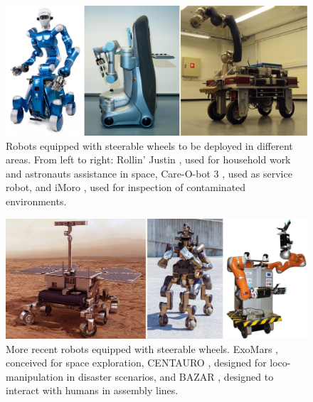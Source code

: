 \begin{figure}
    \centering
    \includegraphics[width=\textwidth]{figures/01-introduction/SWMRs-1.jpg}
    \caption{Robots equipped with steerable wheels to be deployed in different areas.
        From left to right: Rollin' Justin \cite{Fuchs2009RollinJustin}, used 
        for household work and astronauts assistance in space, 
        Care-O-bot 3 \cite{Graf2009Care-O-bot3}, used as service robot, and
        iMoro \cite{Oftadeh2013iMoro}, used for inspection of contaminated
        environments.}
    \label{fig:introduction:SWMRs-1}
\end{figure}

\begin{figure}
    \centering
    \includegraphics[width=\textwidth]{figures/01-introduction/SWMRs-2.jpg}
    \caption{More recent robots equipped with steerable wheels.
        ExoMars \cite{Poulakis2015ExoMarsMobilitySubsystem}, conceived for 
        space exploration,
        CENTAURO \cite{Kashiri2019Centauro}, designed for loco-manipulation
        in disaster scenarios, and
        BAZAR \cite{Cherubini2019ACR}, designed to interact with humans in
        assembly lines.
    }
    \label{fig:introduction:SWMRs-2}
\end{figure}
